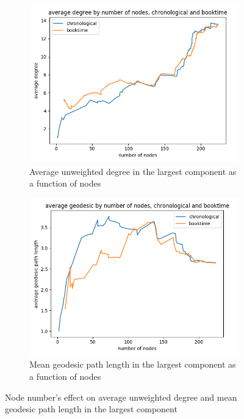 \begin{figure}[ht]
    \centering
    \begin{subfigure}{0.4\textwidth}
        \includegraphics[width=1.\textwidth]{images/n_vs_avg_degree-weighted_False.png}
        \caption{Average unweighted degree in the largest component as a function of nodes}
    \end{subfigure}
    \begin{subfigure}{0.4\textwidth}
        \includegraphics[width=1.\textwidth]{images/n_vs_geodesic-weighted_False.png}
        \caption{Mean geodesic path length in the largest component as a function of nodes}
    \end{subfigure}
    \caption{Node number's effect on average unweighted degree and mean geodesic path length in the largest component}
    \label{sparsification-densification}
\end{figure}

